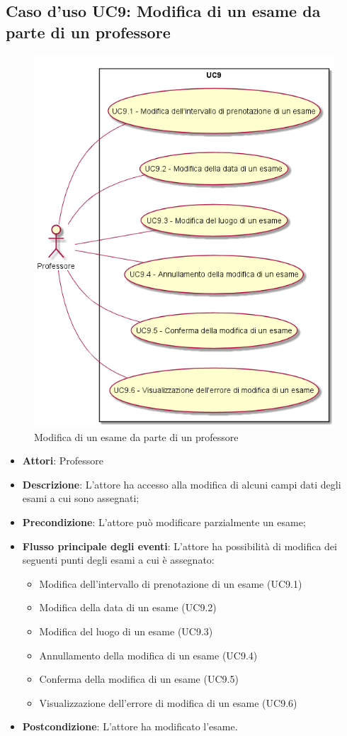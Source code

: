 \subsection{Caso d'uso \texorpdfstring{UC9}{UC9}: Modifica di un esame da parte di un professore}
\begin{figure} [H]
\centering
\includegraphics[scale=0.45]{./img/UC9.png}
\caption{Modifica di un esame da parte di un professore}\label{}
\end{figure}
\begin{itemize}
\item \textbf{Attori}: Professore
\item \textbf{Descrizione}: L'attore ha accesso alla modifica di alcuni campi dati degli esami a cui sono assegnati;
\item \textbf{Precondizione}: L'attore può modificare parzialmente un esame;
\item \textbf{Flusso principale degli eventi}: L'attore ha possibilità di modifica dei seguenti punti degli esami a cui è assegnato:
\begin{itemize}
\item Modifica dell'intervallo di prenotazione di un esame (UC9.1)
\item Modifica della data di un esame (UC9.2)
\item Modifica del luogo di un esame (UC9.3)
\item Annullamento della modifica di un esame (UC9.4)
\item Conferma della modifica di un esame (UC9.5)
\item Visualizzazione dell'errore di modifica di un esame (UC9.6)
\end{itemize}
\item \textbf{Postcondizione}: L'attore ha modificato l'esame.
\end{itemize}
